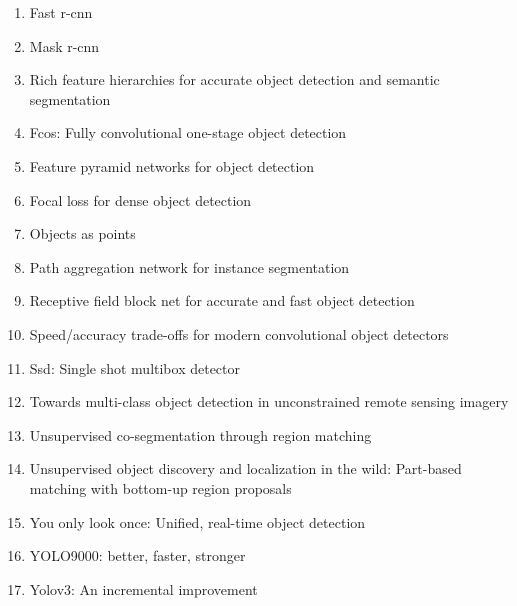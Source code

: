 \documentclass[acmlarge]{acmart}
\begin{document}
\begin{enumerate}
	\item Fast r-cnn \cite{girshick2015fast} 

	\item Mask r-cnn \cite{he2017mask} 

	\item Rich feature hierarchies for accurate object detection and semantic segmentation \cite{girshick2014rich} 

	\item Fcos: Fully convolutional one-stage object detection \cite{tian2019fcos} 

	\item Feature pyramid networks for object detection \cite{lin2017feature} 

	\item Focal loss for dense object detection \cite{lin2017focal} 

	\item Objects as points \cite{zhou2019objects} 

	\item Path aggregation network for instance segmentation \cite{liu2018path} 

	\item Receptive field block net for accurate and fast object detection \cite{liu2018receptive} 

	\item Speed/accuracy trade-offs for modern convolutional object detectors \cite{huang2017speed} 

	\item Ssd: Single shot multibox detector \cite{liu2016ssd} 

	\item Towards multi-class object detection in unconstrained remote sensing imagery \cite{azimi2018towards} 

	\item Unsupervised co-segmentation through region matching \cite{rubio2012unsupervised} 

	\item Unsupervised object discovery and localization in the wild: Part-based matching with bottom-up region proposals \cite{cho2015unsupervised} 

	\item You only look once: Unified, real-time object detection \cite{redmon2016you} 

	\item YOLO9000: better, faster, stronger \cite{redmon2017yolo9000} 

	\item Yolov3: An incremental improvement \cite{redmon2018yolov3} 


\end{enumerate}
\end{document}
